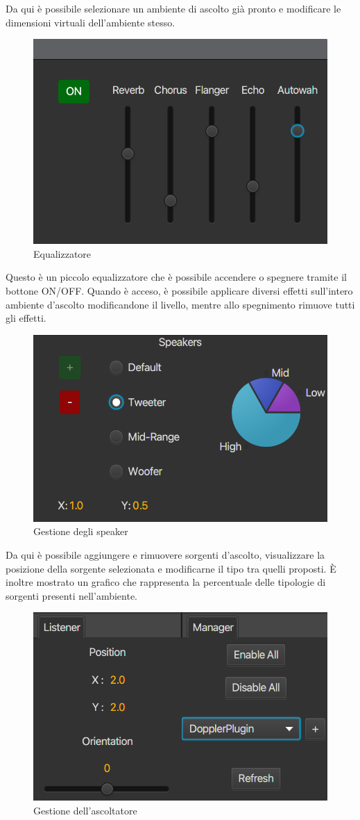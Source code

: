 \documentclass[a4paper,12pt]{report}
\begin{document}
%
Da qui è possibile selezionare un ambiente di ascolto già pronto e modificare le dimensioni virtuali dell'ambiente stesso.
%
\begin{figure}[H]
\centering{}
\includegraphics[width=.75\textwidth]{img/guide/equalizer.png}
\caption{Equalizzatore}
\label{img:equalizer}
\end{figure}
%
Questo è un piccolo equalizzatore che è possibile accendere o spegnere tramite il bottone ON/OFF. Quando è acceso, è possibile applicare diversi effetti sull'intero ambiente d'ascolto modificandone il livello, mentre allo spegnimento rimuove tutti gli effetti.
%
\begin{figure}[H]
\centering{}
\includegraphics[width=.75\textwidth]{img/guide/speaker.png}
\caption{Gestione degli speaker}
\label{img:speakers}
\end{figure}
%
Da qui è possibile aggiungere e rimuovere sorgenti d'ascolto, visualizzare la posizione della sorgente selezionata e modificarne il tipo tra quelli proposti. È inoltre mostrato un grafico che rappresenta la percentuale delle tipologie di sorgenti presenti nell'ambiente.
%
\begin{figure}[H]
\centering{}
\includegraphics[width=.75\textwidth]{img/guide/listener.png}
\caption{Gestione dell'ascoltatore}
\label{img:listener}
\end{figure}
\end{document}
